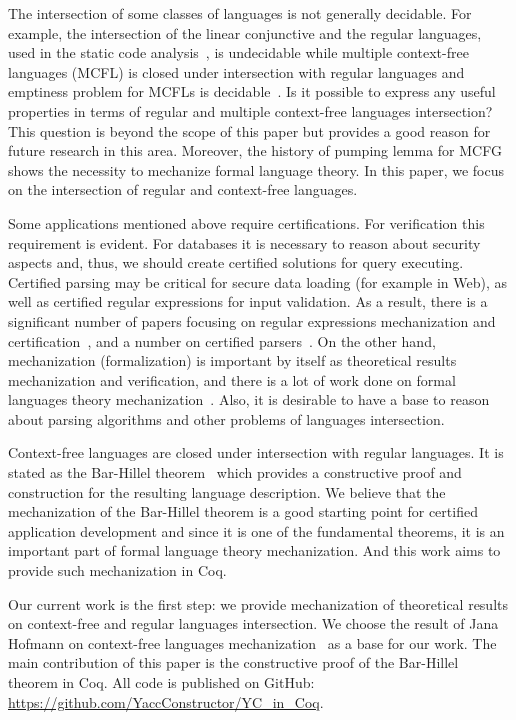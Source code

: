 The intersection of some classes of languages is not generally decidable.
For example, the intersection of the linear conjunctive and the regular languages, used in the static code analysis~\cite{zhang2017context}, is undecidable while multiple context-free languages (MCFL) is closed under intersection with regular languages and emptiness problem for MCFLs is decidable~\cite{SEKI1991191}.
Is it possible to express any useful properties in terms of regular and multiple context-free languages intersection?
This question is beyond the scope of this paper but provides a good reason for future research in this area.
Moreover, the history of pumping lemma for MCFG shows the necessity to mechanize formal language theory.
In this paper, we focus on the intersection of regular and context-free languages.

Some applications mentioned above require certifications.
For verification this requirement is evident.
For databases it is necessary to reason about security aspects and, thus, we should create certified solutions for query executing.
Certified parsing may be critical for secure data loading (for example in Web), as well as certified regular expressions for input validation.
As a result, there is a significant number of papers focusing on regular expressions mechanization and certification~\cite{10.1007/978-3-319-03545-1_7}, and a number on certified parsers~\cite{10.1007/978-3-642-00590-9_12,firsov2014certified,Gross2015ParsingPA}.
On the other hand, mechanization (formalization) is important by itself as theoretical results mechanization and verification, and there is a lot of work done on formal languages theory mechanization~\cite{firsov2015certified,ramos2016formalization,1885-16399}.
Also, it is desirable to have a base to reason about parsing algorithms and other problems of languages intersection.

Context-free languages are closed under intersection with regular languages.
It is stated as the Bar-Hillel theorem~\cite{bar1961formal} which provides a constructive proof and construction for the resulting language description.
We believe that the mechanization of the Bar-Hillel theorem is a good starting point for certified application development and since it is one of the fundamental theorems, it is an important part of formal language theory mechanization.
And this work aims to provide such mechanization in Coq.

Our current work is the first step: we provide mechanization of theoretical results on context-free and regular languages intersection.
We choose the result of Jana Hofmann on context-free languages mechanization~\cite{smolkaHofmann2016} as a base for our work.
The main contribution of this paper is the constructive proof of the Bar-Hillel theorem in Coq. All code is published on GitHub: \url{https://github.com/YaccConstructor/YC_in_Coq}.

